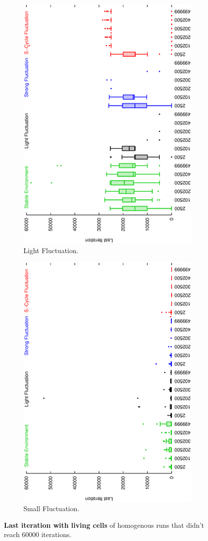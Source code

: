 \begin{figure}[H]
\begin{subfigure}{.25\textwidth}
  \centering
  \includegraphics[width=.7\linewidth, angle =-90]{img/boxendingsFailedvariationLight.eps}
  \caption{Light Fluctuation.}
  \label{fig:sfig2}
\end{subfigure}%
\begin{subfigure}{.25\textwidth}
  \centering
  \includegraphics[width=.7\linewidth, angle =-90]{img/boxendingsFailedvariationSmall.eps}
  \caption{Small Fluctuation.}
  \label{fig:sfig1}
\end{subfigure}
\caption{\textbf{Last iteration with living cells} of homogenous runs that didn't reach 60000 iterations.}
\label{fig:ending}
\end{figure}



